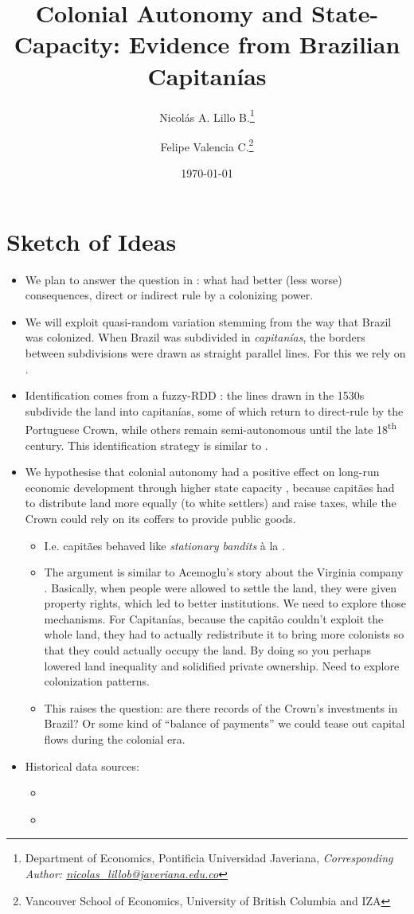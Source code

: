 \documentclass[11pt,a4paper]{article}
\title{Colonial Autonomy and State-Capacity: Evidence from Brazilian Capitan\'ias}
\date{\today}
\author{Nicol\'as A. Lillo B.\thanks{Department of Economics, Pontificia Universidad Javeriana, \emph{Corresponding Author: \href{mailto:nicolas_lillob@javeriana.edu.co}{nicolas\_lillob@javeriana.edu.co}}} \and Felipe Valencia C.\thanks{Vancouver School of Economics, University of British Columbia and IZA}}
\begin{document}
	\maketitle
	
	\section{Sketch of Ideas}
	\begin{itemize}
		\item We plan to answer the question in \textcite{Iyer2010}: what had better (less worse) consequences, direct or indirect rule by a colonizing power.
		\item We will exploit quasi-random variation stemming from the way that Brazil was colonized. When Brazil was subdivided in \emph{capitan\'ias}, the borders between subdivisions were drawn as straight parallel lines. For this we rely on \textcite{Cintra2013}.
		\item Identification comes from a fuzzy-RDD \parencite{Cattaneo2019,Cattaneo2019a}: the lines drawn in the 1530s subdivide the land into capitan\'ias, some of which return to direct-rule by the Portuguese Crown, while others remain semi-autonomous until the late 18\textsuperscript{th} century. This identification strategy is similar to \textcite{Michalopoulos2014}.
		\item We hypothesise that colonial autonomy had a positive effect on long-run economic development through higher state capacity \parencite{Besley2009}, because capit\~aes had to distribute land more equally (to white settlers) and raise taxes, while the Crown could rely on its coffers to provide public goods. 
		\begin{itemize}
			\item I.e. capit\~aes behaved like \emph{stationary bandits} \`{a} la \textcite{Olson1993}.
			\item The argument is similar to Acemoglu's story about the Virginia company \parencite{AcemogluRobinson2012_whynationsfail}. Basically, when people were allowed to settle the land, they were given property rights, which led to better institutions. We need to explore those mechanisms. For Capitan\'ias, because the capit\~ao couldn't exploit the whole land, they had to actually redistribute it to bring more colonists so that they could actually occupy the land. By doing so  you perhaps lowered land inequality and solidified private ownership. Need to explore colonization patterns.
			\item This raises the question: are there records of the Crown's investments in Brazil? Or some kind of ``balance of payments'' we could tease out capital flows during the colonial era.
		\end{itemize}
		\item Historical data sources:
		\begin{itemize}
			\item \textcite{Naritomi2007,Naritomi2012}
			\item \textcite{Fujiwara2017}
		\end{itemize}
	\end{itemize}
\end{document}
